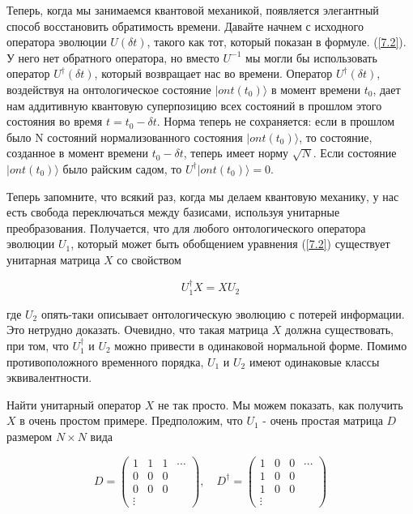\documentclass[main.tex]{subfiles}
\begin{document}
Теперь, когда мы занимаемся квантовой механикой, появляется элегантный способ восстановить обратимость времени. Давайте начнем с исходного оператора эволюции $U (\delta t)$, такого как тот, который показан в формуле. (\ref{7.2}). У него нет обратного оператора, но вместо $U^{-1}$ мы могли бы использовать оператор $U^\dagger(\delta t)$, который возвращает нас во времени. Оператор $U^\dagger(\delta t)$, воздействуя на онтологическое состояние $| ont(t_0) \rangle$ в момент времени $t_0$, дает нам аддитивную квантовую суперпозицию всех состояний в прошлом этого состояния во время $t = t_0 - \delta t$. Норма теперь не сохраняется: если в прошлом было N состояний нормализованного состояния $| ont(t_0) \rangle$, то состояние, созданное в момент времени $t_0 - \delta t$, теперь имеет норму $\sqrt{N}$. Если состояние $| ont(t_0) \rangle$ было райским садом, то $U^\dagger | ont(t_0) \rangle = 0$.

Теперь запомните, что всякий раз, когда мы делаем квантовую механику, у нас есть свобода переключаться между базисами, используя унитарные преобразования. Получается, что для любого онтологического оператора эволюции $U_1$, который может быть обобщением уравнения (\ref{7.2}) существует унитарная матрица $X$ со свойством

\begin{equation}\label{7.3}
	U^\dagger_1 X = X U_2
\end{equation}

где $U_2$ опять-таки описывает онтологическую эволюцию с потерей информации. Это нетрудно доказать. Очевидно, что такая матрица $X$ должна существовать, при том, что $U^\dagger_1$ и $U_2$ можно привести в одинаковой нормальной форме. Помимо противоположного временного порядка, $U_1$ и $U_2$ имеют одинаковые классы эквивалентности.

Найти унитарный оператор $X$ не так просто. Мы можем показать, как получить $X$ в очень простом примере. Предположим, что $U_1$ - очень простая матрица $D$ размером $N \times N$ вида
 
\begin{equation}\label{7.4}
	D=\left(\begin{array}{cccc}{1} & {1} & {1} & {\cdots} \\ {0} & {0} & {0} & {} \\ {0} & {0} & {0} & {} \\ {\vdots} & {} & {} & {}\end{array}\right), \quad D^{\dagger}=\left(\begin{array}{cccc}{1} & {0} & {0} & {\cdots} \\ {1} & {0} & {0} \\ {1} & {0} & {0} \\ {\vdots} & {} & {}\end{array}\right)
\end{equation}
\end{document}
